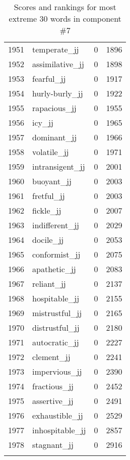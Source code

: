 \begin{longtable}[!htbp]{| rlr@{.}l |}
    1951 & temperate\_jj & 0 & 1896 \\
    1952 & assimilative\_jj & 0 & 1898 \\
    1953 & fearful\_jj & 0 & 1917 \\
    1954 & hurly-burly\_jj & 0 & 1922 \\
    1955 & rapacious\_jj & 0 & 1955 \\
    1956 & icy\_jj & 0 & 1965 \\
    1957 & dominant\_jj & 0 & 1966 \\
    1958 & volatile\_jj & 0 & 1971 \\
    1959 & intransigent\_jj & 0 & 2001 \\
    1960 & buoyant\_jj & 0 & 2003 \\
    1961 & fretful\_jj & 0 & 2003 \\
    1962 & fickle\_jj & 0 & 2007 \\
    1963 & indifferent\_jj & 0 & 2029 \\
    1964 & docile\_jj & 0 & 2053 \\
    1965 & conformist\_jj & 0 & 2075 \\
    1966 & apathetic\_jj & 0 & 2083 \\
    1967 & reliant\_jj & 0 & 2137 \\
    1968 & hospitable\_jj & 0 & 2155 \\
    1969 & mistrustful\_jj & 0 & 2165 \\
    1970 & distrustful\_jj & 0 & 2180 \\
    1971 & autocratic\_jj & 0 & 2227 \\
    1972 & clement\_jj & 0 & 2241 \\
    1973 & impervious\_jj & 0 & 2390 \\
    1974 & fractious\_jj & 0 & 2452 \\
    1975 & assertive\_jj & 0 & 2491 \\
    1976 & exhaustible\_jj & 0 & 2529 \\
    1977 & inhospitable\_jj & 0 & 2857 \\
    1978 & stagnant\_jj & 0 & 2916 \\
    \hline
    \caption{Scores and rankings for most extreme 30 words in component \#7} \\
\end{longtable}
